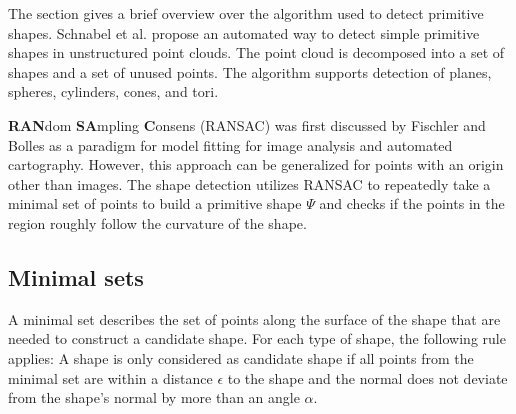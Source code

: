 The section gives a brief overview over the algorithm used to detect primitive shapes. 
Schnabel et al. \cite{schnabel-2007-efficient} propose an automated way to detect simple primitive shapes in unstructured point clouds. The point cloud is decomposed into a set of shapes and a set of unused points. The algorithm supports detection of planes, spheres, cylinders, cones, and tori. 

\textbf{RAN}dom \textbf{SA}mpling \textbf{C}onsens (RANSAC) was first discussed by Fischler and Bolles \cite{fischler1981random} as a paradigm for model fitting for image analysis and automated cartography. However, this approach can be generalized for points with an origin other than images. The shape detection utilizes RANSAC to repeatedly take a minimal set of points to build a primitive shape $\Psi$ and checks if the points in the region roughly follow the curvature of the shape. 

\subsection{Minimal sets}

A minimal set describes the set of points along the surface of the shape that are needed to construct a candidate shape. 
For each type of shape, the following rule applies: A shape is only considered as candidate shape if all points from the minimal set are within a distance $\epsilon$ to the shape and the normal does not deviate from the shape's normal by more than an angle $\alpha$. 

